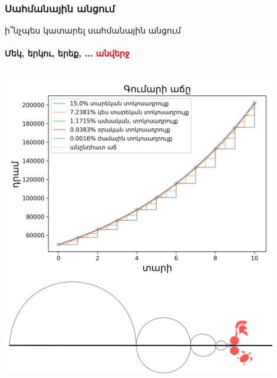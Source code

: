 \documentclass[aspectratio=169]{beamer} %
\begin{document}
\begin{frame}
\begin{columns}
{        }
        \end{columns}
    \end{frame}
    \begin{frame}
        \frametitle{Սահմանային անցում}
        ի՞նչպես կատարել սահմանային անցում
        \framesubtitle{Մեկ, երկու, երեք, ․․․ \textcolor{red}{անվերջ}}
        \begin{columns}
            \includegraphics[width = 0.9\textwidth]{1_2_12_365_8766_0x100_c.png}
            \includegraphics[width = 0.9\textwidth]{zeno_achilles_paradox_i.png}
        \end{columns}
    \end{frame}
\end{document}
